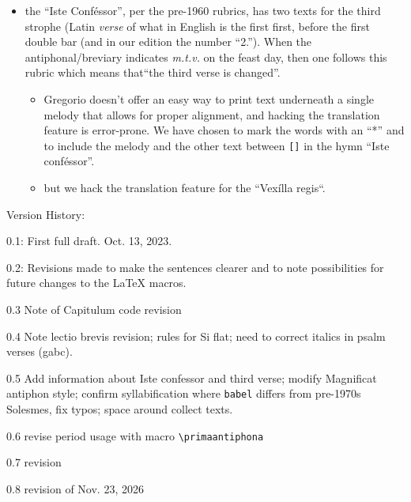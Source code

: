 \documentclass[11pt]{article}
\begin{document}
\begin{itemize}
\begin{itemize}
\item only special feasts (cf. Feria VI post Dom. Passionis) and major feasts require the date to be at the top of the entry; the rest have the date on the left side, with the entry centered, then the rank is below.
\end{itemize}
\item the ``Iste Conféssor'', per the pre-1960 rubrics, has two texts for the third strophe (Latin \textit{verse} of what in English is the first first, before the first double bar (and in our edition the number ``2.''). When the antiphonal/breviary indicates \textit{m.t.v.} on the feast day, then one follows this rubric which means that``the third verse is changed''.

\begin{itemize}
\item
Gregorio doesn't offer an easy way to print text underneath a single melody that allows for proper alignment, and hacking the translation feature is error-prone. We have chosen to mark the words with an ``*'' and to include the melody and the other text between \verb|[]| in the hymn ``Iste conféssor''.
\item but we hack the translation feature for the ``Vexílla regis``.
\end{itemize}
\end{itemize}

Version History:

0.1: First full draft. Oct. 13, 2023.

0.2: Revisions made to make the sentences clearer and to note possibilities for future changes to the LaTeX{} macros.

0.3 Note of Capitulum code revision

0.4 Note lectio brevis revision; rules for Si flat; need to correct italics in psalm verses (gabc).

0.5 Add information about Iste confessor and third verse; modify Magnificat antiphon style; confirm syllabification where \verb|babel| differs from pre-1970s Solesmes, fix typos; space around collect texts.

0.6 revise period usage with macro \verb|\primaantiphona|

0.7 revision

0.8 revision of Nov. 23, 2026
\end{document}

